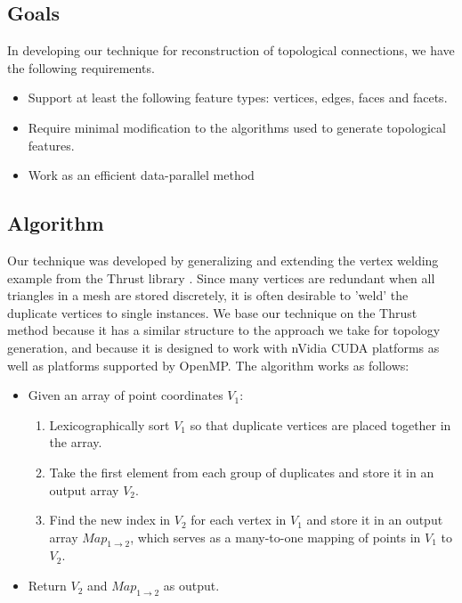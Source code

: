 \documentclass[journal]{vgtc}                %
\begin{document}
\subsection{Goals}
In developing our technique for reconstruction of topological connections, we have the
following requirements.
\begin{itemize}
	\item{Support at least the following feature types: vertices, edges, faces and facets.}

	\item{Require minimal modification to the algorithms used to generate topological features.}

	\item{Work as an efficient data-parallel method}
 
\end{itemize}

\subsection{Algorithm}
Our technique was developed by generalizing and extending the vertex welding example from the Thrust library \cite{Bell2012}.
Since many vertices are redundant when all triangles in a mesh are stored discretely, it is often desirable to
'weld' the duplicate vertices to single instances. We base our technique on the Thrust method because it has a similar
structure to the approach we take for topology generation, and because it is designed to work with nVidia CUDA platforms as well as platforms supported by OpenMP. The algorithm works as follows:
\begin{itemize}
	\item{Given an array of point coordinates $V_1$:}
	\begin{enumerate}
		\item{Lexicographically sort $V_1$ so that duplicate vertices are placed together in the array.}
		\item{Take the first element from each group of duplicates and store it in an output array $V_2$.}
		\item{Find the new index in $V_2$ for each vertex in $V_1$ and store it in an output array $Map_{1\rightarrow 2}$, which serves as a many-to-one mapping of points in $V_1$ to $V_2$.}
	\end{enumerate}
	\item{Return $V_2$ and $Map_{1\rightarrow 2}$ as output.}
\end{itemize}
\end{document}

